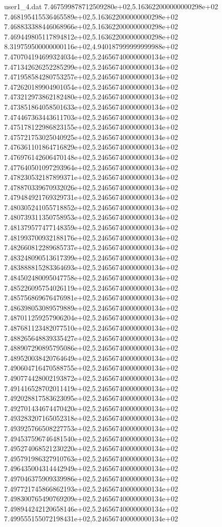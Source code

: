 \begin{filecontents}{user1_4.dat}
7.467599878712509280e+02,5.163622000000000298e+02
7.468195415536465589e+02,5.163622000000000298e+02
7.468833388446068966e+02,5.163622000000000298e+02
7.469449805117894812e+02,5.163622000000000298e+02
8.319759500000000116e+02,4.940187999999999988e+02
7.470704194699324034e+02,5.246567400000000134e+02
7.471342626252285299e+02,5.246567400000000134e+02
7.471958584280753257e+02,5.246567400000000134e+02
7.472620189904901054e+02,5.246567400000000134e+02
7.473212973862182480e+02,5.246567400000000134e+02
7.473851864058501633e+02,5.246567400000000134e+02
7.474467363443611703e+02,5.246567400000000134e+02
7.475178122986823155e+02,5.246567400000000134e+02
7.475721753025040925e+02,5.246567400000000134e+02
7.476361101864716829e+02,5.246567400000000134e+02
7.476976142606470148e+02,5.246567400000000134e+02
7.477640501097293964e+02,5.246567400000000134e+02
7.478230532187899371e+02,5.246567400000000134e+02
7.478870339670932026e+02,5.246567400000000134e+02
7.479484921769329731e+02,5.246567400000000134e+02
7.480305241055718852e+02,5.246567400000000134e+02
7.480739311350758953e+02,5.246567400000000134e+02
7.481379577477148359e+02,5.246567400000000134e+02
7.481993700932188176e+02,5.246567400000000134e+02
7.482660812289685737e+02,5.246567400000000134e+02
7.483248090513617399e+02,5.246567400000000134e+02
7.483888815283364693e+02,5.246567400000000134e+02
7.484502480095047758e+02,5.246567400000000134e+02
7.485226095754026119e+02,5.246567400000000134e+02
7.485756869676476981e+02,5.246567400000000134e+02
7.486398053089579889e+02,5.246567400000000134e+02
7.487011259257906204e+02,5.246567400000000134e+02
7.487681123482077510e+02,5.246567400000000134e+02
7.488265648839335427e+02,5.246567400000000134e+02
7.488907290895795086e+02,5.246567400000000134e+02
7.489520038420764649e+02,5.246567400000000134e+02
7.490604716470588755e+02,5.246567400000000134e+02
7.490774428002193872e+02,5.246567400000000134e+02
7.491416528702011419e+02,5.246567400000000134e+02
7.492028817583623095e+02,5.246567400000000134e+02
7.492701434674470420e+02,5.246567400000000134e+02
7.493283207165052318e+02,5.246567400000000134e+02
7.493925766508227753e+02,5.246567400000000134e+02
7.494537596746481540e+02,5.246567400000000134e+02
7.495274068521230220e+02,5.246567400000000134e+02
7.495791986327910763e+02,5.246567400000000134e+02
7.496435004314442949e+02,5.246567400000000134e+02
7.497046375909339986e+02,5.246567400000000134e+02
7.497721745866862193e+02,5.246567400000000134e+02
7.498300765490769209e+02,5.246567400000000134e+02
7.498944242120658146e+02,5.246567400000000134e+02
7.499555155072198431e+02,5.246567400000000134e+02

\end{filecontents}
